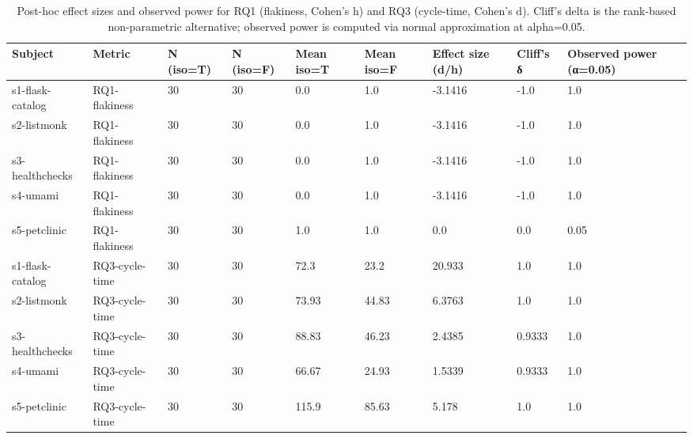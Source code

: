 \begin{table}[t]
\centering
\caption{Post-hoc effect sizes and observed power for RQ1 (flakiness, Cohen's h) and RQ3 (cycle-time, Cohen's d). Cliff's delta is the rank-based non-parametric alternative; observed power is computed via normal approximation at alpha=0.05.}
\label{tab:T1_effect_sizes}
\begin{tabular}{lllllllll}
\hline
Subject & Metric & N (iso=T) & N (iso=F) & Mean iso=T & Mean iso=F & Effect size (d/h) & Cliff's δ & Observed power (α=0.05) \\
\hline
s1-flask-catalog & RQ1-flakiness & 30 & 30 & 0.0 & 1.0 & -3.1416 & -1.0 & 1.0 \\
s2-listmonk & RQ1-flakiness & 30 & 30 & 0.0 & 1.0 & -3.1416 & -1.0 & 1.0 \\
s3-healthchecks & RQ1-flakiness & 30 & 30 & 0.0 & 1.0 & -3.1416 & -1.0 & 1.0 \\
s4-umami & RQ1-flakiness & 30 & 30 & 0.0 & 1.0 & -3.1416 & -1.0 & 1.0 \\
s5-petclinic & RQ1-flakiness & 30 & 30 & 1.0 & 1.0 & 0.0 & 0.0 & 0.05 \\
s1-flask-catalog & RQ3-cycle-time & 30 & 30 & 72.3 & 23.2 & 20.933 & 1.0 & 1.0 \\
s2-listmonk & RQ3-cycle-time & 30 & 30 & 73.93 & 44.83 & 6.3763 & 1.0 & 1.0 \\
s3-healthchecks & RQ3-cycle-time & 30 & 30 & 88.83 & 46.23 & 2.4385 & 0.9333 & 1.0 \\
s4-umami & RQ3-cycle-time & 30 & 30 & 66.67 & 24.93 & 1.5339 & 0.9333 & 1.0 \\
s5-petclinic & RQ3-cycle-time & 30 & 30 & 115.9 & 85.63 & 5.178 & 1.0 & 1.0 \\
\hline
\end{tabular}
\end{table}
